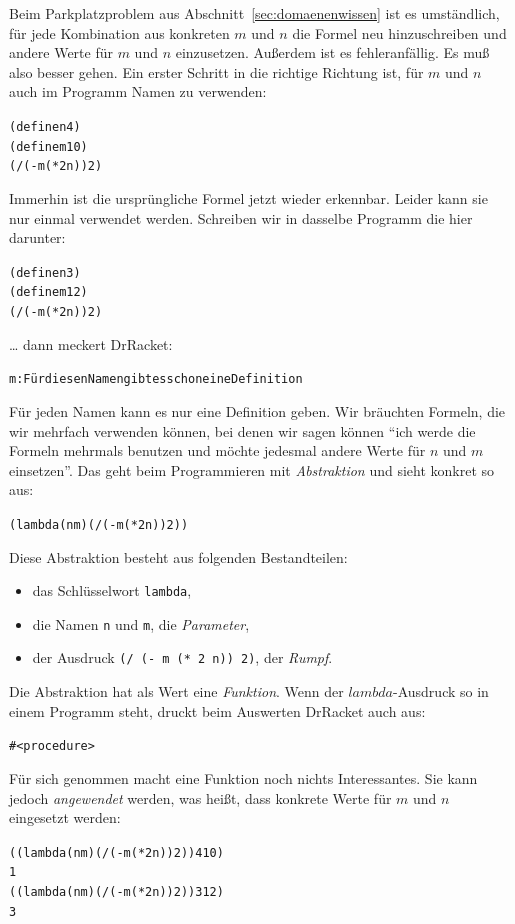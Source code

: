 Beim Parkplatzproblem aus Abschnitt~\ref{sec:domaenenwissen} ist es
umständlich, für jede Kombination aus konkreten $m$ und $n$ die 
Formel neu hinzuschreiben und andere Werte für $m$ und $n$
einzusetzen.  Außerdem ist es fehleranfällig.  Es muß also besser
gehen.  Ein erster Schritt in die richtige Richtung ist, für $m$ und
$n$ auch im Programm Namen zu verwenden:
%
\begin{alltt}
(define n 4)
(define m 10)
(/ (- m (* 2 n)) 2)
\end{alltt}
%
Immerhin ist die ursprüngliche Formel jetzt wieder erkennbar.  Leider
kann sie nur einmal verwendet werden.  Schreiben wir in dasselbe
Programm die hier darunter:
%
\begin{alltt}
(define n 3)
(define m 12)
(/ (- m (* 2 n)) 2)
\end{alltt}
%
\ldots{} dann meckert DrRacket:
%
\begin{alltt}
m: Für diesen Namen gibt es schon eine Definition
\end{alltt}
%
Für jeden Namen kann es nur eine Definition geben.  Wir bräuchten
Formeln, die wir mehrfach verwenden können, bei denen wir sagen können
"`ich werde die Formeln mehrmals benutzen und möchte jedesmal andere
Werte für $n$ und $m$ einsetzen"'. Das geht beim Programmieren mit
\textit{Abstraktion} und sieht konkret so aus:
%
\begin{alltt}
(lambda (n m) (/ (- m (* 2 n)) 2))
\end{alltt}
%
Diese Abstraktion besteht aus folgenden Bestandteilen:
\begin{itemize}
\item das Schlüsselwort \texttt{lambda},
\item die Namen \texttt{n} und \texttt{m}, die \textit{Parameter},
\item der Ausdruck \texttt{(/ (- m (* 2 n)) 2)}, der \textit{Rumpf}.
\end{itemize}
%
Die Abstraktion hat als Wert eine \textit{Funktion}.  Wenn der
$lambda$-Ausdruck so in einem Programm steht, druckt beim Auswerten
DrRacket auch aus:
%
\begin{alltt}
#<procedure>
\end{alltt}
%
Für sich genommen macht eine Funktion noch nichts Interessantes.  Sie kann jedoch
\emph{angewendet} werden, was heißt, dass konkrete Werte für $m$ und
$n$ eingesetzt werden:
%
\begin{alltt}
((lambda (n m) (/ (- m (* 2 n)) 2)) 4 10)
\evalsto{} 1
((lambda (n m) (/ (- m (* 2 n)) 2)) 3 12)
\evalsto{} 3
\end{alltt}

